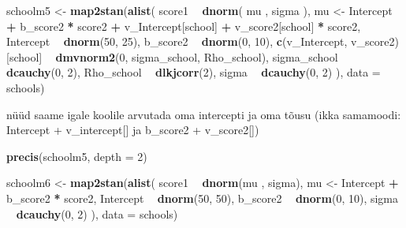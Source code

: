 \documentclass[]{book}
\newenvironment{Shaded}{\begin{snugshade}}{\end{snugshade}}
\newcommand{\KeywordTok}[1]{\textcolor[rgb]{0.13,0.29,0.53}{\textbf{#1}}}
\newcommand{\DataTypeTok}[1]{\textcolor[rgb]{0.13,0.29,0.53}{#1}}
\newcommand{\DecValTok}[1]{\textcolor[rgb]{0.00,0.00,0.81}{#1}}
\newcommand{\StringTok}[1]{\textcolor[rgb]{0.31,0.60,0.02}{#1}}
\newcommand{\OperatorTok}[1]{\textcolor[rgb]{0.81,0.36,0.00}{\textbf{#1}}}
\newcommand{\NormalTok}[1]{#1}
\begin{document}
\begin{Shaded}
\begin{Highlighting}[]
\NormalTok{schoolm5 <-}\StringTok{ }\KeywordTok{map2stan}\NormalTok{(}\KeywordTok{alist}\NormalTok{(}
\NormalTok{    score1 }\OperatorTok{~}\StringTok{ }\KeywordTok{dnorm}\NormalTok{( mu , sigma ),}
\NormalTok{    mu <-}\StringTok{ }\NormalTok{Intercept }\OperatorTok{+}\StringTok{ }\NormalTok{b_score2 }\OperatorTok{*}\StringTok{ }\NormalTok{score2 }\OperatorTok{+}\StringTok{ }
\StringTok{      }\NormalTok{v_Intercept[school] }\OperatorTok{+}\StringTok{ }
\StringTok{      }\NormalTok{v_score2[school] }\OperatorTok{*}\StringTok{ }\NormalTok{score2,}
\NormalTok{    Intercept }\OperatorTok{~}\StringTok{ }\KeywordTok{dnorm}\NormalTok{(}\DecValTok{50}\NormalTok{, }\DecValTok{25}\NormalTok{),}
\NormalTok{    b_score2 }\OperatorTok{~}\StringTok{ }\KeywordTok{dnorm}\NormalTok{(}\DecValTok{0}\NormalTok{, }\DecValTok{10}\NormalTok{),}
    \KeywordTok{c}\NormalTok{(v_Intercept, v_score2)[school] }\OperatorTok{~}\StringTok{ }\KeywordTok{dmvnorm2}\NormalTok{(}\DecValTok{0}\NormalTok{, sigma_school, Rho_school),}
\NormalTok{    sigma_school }\OperatorTok{~}\StringTok{ }\KeywordTok{dcauchy}\NormalTok{(}\DecValTok{0}\NormalTok{, }\DecValTok{2}\NormalTok{),}
\NormalTok{    Rho_school }\OperatorTok{~}\StringTok{ }\KeywordTok{dlkjcorr}\NormalTok{(}\DecValTok{2}\NormalTok{),}
\NormalTok{    sigma }\OperatorTok{~}\StringTok{ }\KeywordTok{dcauchy}\NormalTok{(}\DecValTok{0}\NormalTok{, }\DecValTok{2}\NormalTok{)}
\NormalTok{), }\DataTypeTok{data =}\NormalTok{ schools)}
\end{Highlighting}
\end{Shaded}

nüüd saame igale koolile arvutada oma intercepti ja oma tõusu (ikka
samamoodi: Intercept + v\_intercept{[}{]} ja b\_score2 +
v\_score2{[}{]})

\begin{Shaded}
\begin{Highlighting}[]
\KeywordTok{precis}\NormalTok{(schoolm5, }\DataTypeTok{depth =} \DecValTok{2}\NormalTok{)}
\end{Highlighting}
\end{Shaded}

\begin{Shaded}
\begin{Highlighting}[]
\NormalTok{schoolm6 <-}\StringTok{ }\KeywordTok{map2stan}\NormalTok{(}\KeywordTok{alist}\NormalTok{(}
\NormalTok{  score1 }\OperatorTok{~}\StringTok{ }\KeywordTok{dnorm}\NormalTok{(mu , sigma),}
\NormalTok{  mu <-}\StringTok{ }\NormalTok{Intercept }\OperatorTok{+}\StringTok{ }\NormalTok{b_score2 }\OperatorTok{*}\StringTok{ }\NormalTok{score2,}
\NormalTok{  Intercept }\OperatorTok{~}\StringTok{ }\KeywordTok{dnorm}\NormalTok{(}\DecValTok{50}\NormalTok{, }\DecValTok{50}\NormalTok{),}
\NormalTok{  b_score2 }\OperatorTok{~}\StringTok{ }\KeywordTok{dnorm}\NormalTok{(}\DecValTok{0}\NormalTok{, }\DecValTok{10}\NormalTok{),}
\NormalTok{  sigma }\OperatorTok{~}\StringTok{ }\KeywordTok{dcauchy}\NormalTok{(}\DecValTok{0}\NormalTok{, }\DecValTok{2}\NormalTok{)}
\NormalTok{), }\DataTypeTok{data =}\NormalTok{ schools)}
\end{Highlighting}
\end{Shaded}
\end{document}
